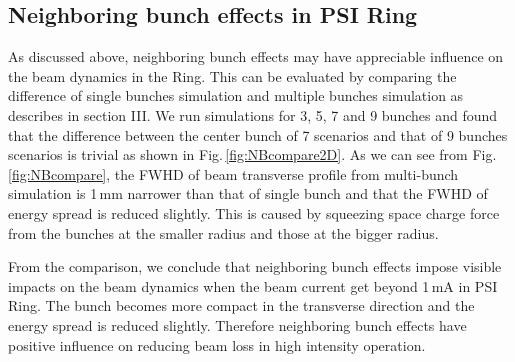 \documentclass{JAC2003}
\begin{document}
\subsection {Neighboring bunch effects in PSI Ring}

As discussed above, neighboring bunch effects may have appreciable influence on the beam dynamics in the Ring. This can be evaluated by comparing the difference of single bunches simulation and multiple bunches simulation as describes in section III. We run simulations for 3, 5, 7 and 9 bunches and found that 
the difference between the center bunch of 7 scenarios and that of 9 bunches scenarios is trivial as shown in Fig.\,\ref{fig:NBcompare2D}. 
As we can see from Fig.\,\ref{fig:NBcompare}, the FWHD of beam transverse profile from multi-bunch simulation is 1\,mm narrower than that of single bunch and that the FWHD of energy spread is reduced slightly. This is caused by squeezing space charge force from the bunches at the smaller radius 
and those at the bigger radius. 

From the comparison, we conclude that neighboring bunch effects impose visible impacts on the beam dynamics when the beam current get beyond 1\,mA in PSI Ring. 
The bunch becomes more compact in the transverse direction and the energy spread is reduced slightly. Therefore neighboring bunch effects have positive influence
on reducing beam loss in high intensity operation.
\end{document}
